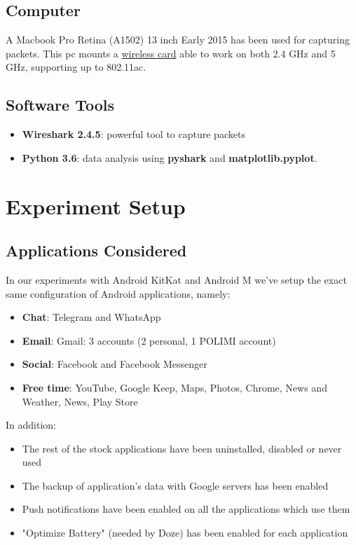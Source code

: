 \documentclass[11pt, a4paper]{article}
\begin{document}
	\subsection{Computer}
	A Macbook Pro Retina (A1502) 13 inch Early 2015 has been used for capturing packets. This pc mounts a \href{https://www.ifixit.com/Store/Mac/MacBook-Pro-13-Inch-Retina-Early-2015-Airport-Bluetooth-Board/IF123-048-1}{wireless card} able to work on both 2.4 GHz and 5 GHz, supporting up to 802.11ac.
	
	\subsection{Software Tools}
	\begin{itemize}
		\item \textbf{Wireshark 2.4.5}: powerful tool to capture packets
		\item \textbf{Python 3.6}: data analysis using \textbf{pyshark} and \textbf{matplotlib.pyplot}.
	\end{itemize}

	\section{Experiment Setup}
	\subsection{Applications Considered}
	In our experiments with Android KitKat and Android M we've setup the exact same configuration of Android applications, namely:
	\begin{itemize}
	    \item \textbf{Chat}: Telegram and WhatsApp
	    \item \textbf{Email}: Gmail: 3 accounts (2 personal, 1 POLIMI account)
	    \item \textbf{Social}: Facebook and Facebook Messenger
	    \item \textbf{Free time}: YouTube, Google Keep, Maps, Photos, Chrome, News and Weather, News, Play Store
	\end{itemize}
	
	\noindent In addition:
	\begin{itemize}
	    \item The rest of the stock applications have been uninstalled, disabled or never used
	    \item The backup of application's data with Google servers has been enabled
	    \item Push notifications have been enabled on all the applications which use them
	    \item "Optimize Battery" (needed by Doze) has been enabled for each application
	\end{itemize}
	
\end{document}
